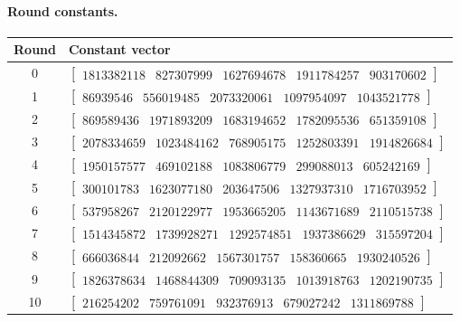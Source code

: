 \paragraph{Round constants.}
\begin{longtable}{@{}cl@{}}
\toprule
Round & Constant vector \\
\midrule
\endhead
0 & $\begin{bmatrix}1813382118 & 827307999 & 1627694678 & 1911784257 & 903170602\end{bmatrix}$ \\
1 & $\begin{bmatrix}86939546 & 556019485 & 2073320061 & 1097954097 & 1043521778\end{bmatrix}$ \\
2 & $\begin{bmatrix}869589436 & 1971893209 & 1683194652 & 1782095536 & 651359108\end{bmatrix}$ \\
3 & $\begin{bmatrix}2078334659 & 1023484162 & 768905175 & 1252803391 & 1914826684\end{bmatrix}$ \\
4 & $\begin{bmatrix}1950157577 & 469102188 & 1083806779 & 299088013 & 605242169\end{bmatrix}$ \\
5 & $\begin{bmatrix}300101783 & 1623077180 & 203647506 & 1327937310 & 1716703952\end{bmatrix}$ \\
6 & $\begin{bmatrix}537958267 & 2120122977 & 1953665205 & 1143671689 & 2110515738\end{bmatrix}$ \\
7 & $\begin{bmatrix}1514345872 & 1739928271 & 1292574851 & 1937386629 & 315597204\end{bmatrix}$ \\
8 & $\begin{bmatrix}666036844 & 212092662 & 1567301757 & 158360665 & 1930240526\end{bmatrix}$ \\
9 & $\begin{bmatrix}1826378634 & 1468844309 & 709093135 & 1013918763 & 1202190735\end{bmatrix}$ \\
10 & $\begin{bmatrix}216254202 & 759761091 & 932376913 & 679027242 & 1311869788\end{bmatrix}$ \\

\end{longtable}
